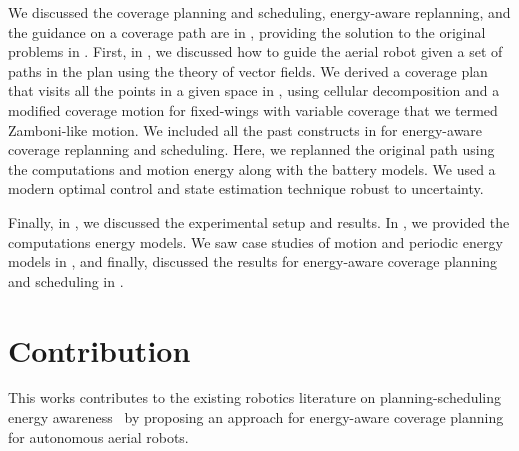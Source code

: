 We discussed the coverage planning and scheduling, energy-aware replanning, and the guidance on a coverage path are in , providing the solution to the original problems in . First, in , we discussed how to guide the aerial robot given a set of paths in the plan using the theory of vector fields. We derived a coverage plan that visits all the points in a given space in , using cellular decomposition and a modified coverage motion for fixed-wings with variable coverage that we termed Zamboni-like motion. We included all the past constructs in  for energy-aware coverage replanning and scheduling. Here, we replanned the original path using the computations and motion energy along with the battery models. We used a modern optimal control and state estimation technique robust to uncertainty. 

Finally, in , we discussed the experimental setup and results. In , we provided the \powprof{} computations energy models. We saw case studies of motion and periodic energy models in , and finally, discussed the results for energy-aware coverage planning and scheduling in .


\section{Contribution}

This works contributes to the existing robotics literature on planning-scheduling energy awareness~\citep{mei2005case,mei2006deployment,brateman2006energy,zhang2007low,sadrpour2013experimental,sadrpour2013mission,ondruska2015scheduled,lahijanian2018resource,sudhakar2020balancing} by proposing an approach for energy-aware coverage planning for autonomous aerial robots.

